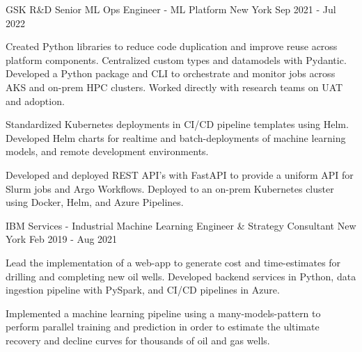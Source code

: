 \begin{cventries}
\cventrywide
  {GSK R\&D} %
  {Senior ML Ops Engineer - ML Platform} %
  {New York} %
  {Sep 2021 - Jul 2022} %
  {
    \begin{cvitems} %
      \item { Created Python libraries to reduce code duplication and improve reuse across platform components. Centralized custom types and datamodels with Pydantic. Developed a Python package and CLI to orchestrate and monitor jobs across AKS and on-prem HPC clusters. Worked directly with research teams on UAT and adoption. }
      \item { Standardized Kubernetes deployments in CI/CD pipeline templates using Helm. Developed Helm charts for realtime and batch-deployments of machine learning models, and remote development environments. }
      \item { Developed and deployed REST API's with FastAPI to provide a uniform API for Slurm jobs and Argo Workflows. Deployed to an on-prem Kubernetes cluster using Docker, Helm, and Azure Pipelines. }
    \end{cvitems}
  }
  \cventrywide
    {IBM Services - Industrial}  %
    {Machine Learning Engineer \& Strategy Consultant} %
    {New York} %
    {Feb 2019 - Aug 2021} %
    {
      \begin{cvitems} %
        \item {Lead the implementation of a web-app to generate cost and time-estimates for drilling and completing new oil wells. Developed backend services in Python, data ingestion pipeline with PySpark, and CI/CD pipelines in Azure.}
        \item {Implemented a machine learning pipeline using a many-models-pattern to perform parallel training and prediction in order to estimate the ultimate recovery and decline curves for thousands of oil and gas wells.}
      \end{cvitems}
    }


\end{cventries}

